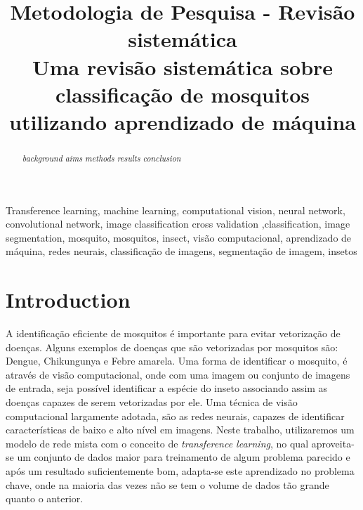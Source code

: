 \documentclass[conference]{IEEEtran}
\begin{document}
\title{Metodologia de Pesquisa - Revisão sistemática\\
{\footnotesize Uma revisão sistemática sobre classificação de mosquitos utilizando aprendizado de máquina}
}

\author{
}

\maketitle

\begin{abstract}
\emph{background}
\emph{aims}
\emph{methods}
\emph{results}
\emph{conclusion}
\end{abstract}

\begin{IEEEkeywords}
Transference learning, machine learning, computational vision,  neural network, convolutional network, image classification cross validation ,classification, image segmentation, mosquito, mosquitos, insect, visão computacional, aprendizado de máquina, redes neurais, classificação de imagens, segmentação de imagem, insetos 
\end{IEEEkeywords}

\section{Introduction}
A identificação eficiente de mosquitos é importante para evitar vetorização de doenças. Alguns exemplos de doenças que são vetorizadas por mosquitos são: Dengue, Chikungunya e Febre amarela.
%
Uma forma de identificar o mosquito, é através de visão computacional, onde com uma imagem ou conjunto de imagens de entrada, seja possível identificar a espécie do inseto associando assim as doenças capazes de serem vetorizadas por ele.
%
Uma técnica de visão computacional largamente adotada, são as redes neurais, capazes de identificar características de baixo e alto nível em imagens. Neste trabalho, utilizaremos um modelo de rede mista com o conceito de \emph{transference learning}, no qual aproveita-se um conjunto de dados maior para treinamento de algum problema parecido e após um resultado suficientemente bom, adapta-se este aprendizado no problema chave, onde na maioria das vezes não se tem o volume de dados tão grande quanto o anterior.
\end{document}
